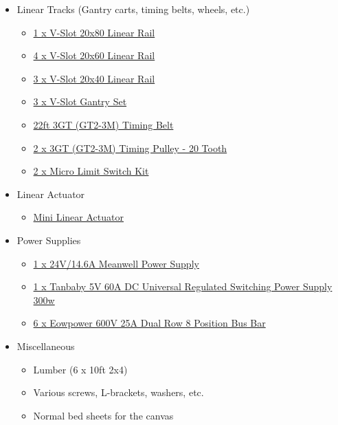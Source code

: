 \documentclass[11pt]{IEEEtran}
\begin{document}
\begin{itemize}
\item Linear Tracks (Gantry carts, timing belts, wheels, etc.)
  \begin{itemize}
  \item \href{https://openbuildspartstore.com/v-slot-20x80-linear-rail/}{1 x V-Slot 20x80 Linear Rail}
  \item \href{https://openbuildspartstore.com/v-slot-20x60-linear-rail/}{4 x V-Slot 20x60 Linear Rail}
  \item \href{https://openbuildspartstore.com/v-slot-20x40-linear-rail/}{3 x V-Slot 20x40 Linear Rail}
  \item \href{https://openbuildspartstore.com/v-slot-gantry-set-universal/}{3 x V-Slot Gantry Set}
  \item \href{https://openbuildspartstore.com/3gt-gt2-3m-timing-belt-by-the-foot/}{22ft 3GT (GT2-3M) Timing Belt}
  \item \href{https://openbuildspartstore.com/3gt-timing-pulley-20-tooth/}{2 x 3GT (GT2-3M) Timing Pulley - 20 Tooth}
  \item \href{https://openbuildspartstore.com/micro-limit-switch-kit/}{2 x Micro Limit Switch Kit}
  \end{itemize}

\item Linear Actuator
  \begin{itemize}
  \item \href{https://openbuildspartstore.com/micro-limit-switch-kit/}{Mini Linear Actuator}
  \end{itemize}

\item Power Supplies
  \begin{itemize}
  \item \href{https://openbuildspartstore.com/24v-14-6a-meanwell-power-supply/}{1 x 24V/14.6A Meanwell Power Supply}
  \item \href{https://www.amazon.com/Tanbaby-Universal-Regulated-Switching-Computer/dp/B017YEOAPA}{1 x Tanbaby 5V 60A DC Universal Regulated Switching Power Supply 300w}
  \item \href{https://www.amazon.com/gp/product/B06XKFCTSM/ref=oh_aui_detailpage_o05_s00?ie=UTF8&psc=1}{6 x Eowpower 600V 25A Dual Row 8 Position Bus Bar } 
  \end{itemize}

\item Miscellaneous
  \begin{itemize}
  \item Lumber (6 x 10ft 2x4)
  \item Various screws, L-brackets, washers, etc.
  \item Normal bed sheets for the canvas
  \end{itemize}
\end{itemize}
\end{document}
